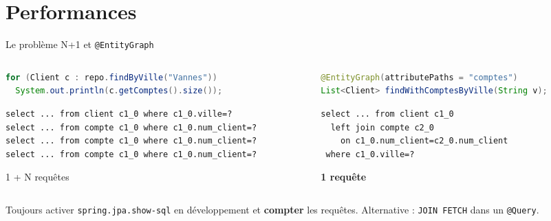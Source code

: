 \documentclass[aspectratio=169,10pt]{beamer}
\begin{document}
\section{Performances}

\begin{frame}[fragile]{Le probl\`eme N+1 et \texttt{@EntityGraph}}
  \begin{columns}[T]
    \begin{column}{0.49\textwidth}
\begin{lstlisting}[language=Java]
for (Client c : repo.findByVille("Vannes"))
  System.out.println(c.getComptes().size());
\end{lstlisting}
\begin{lstlisting}[style=log]
select ... from client c1_0 where c1_0.ville=?
select ... from compte c1_0 where c1_0.num_client=?
select ... from compte c1_0 where c1_0.num_client=?
select ... from compte c1_0 where c1_0.num_client=?
\end{lstlisting}
      \centering\alert{1 + N requ\^etes}
    \end{column}
    \begin{column}{0.49\textwidth}
\begin{lstlisting}[language=Java]
@EntityGraph(attributePaths = "comptes")
List<Client> findWithComptesByVille(String v);
\end{lstlisting}
\begin{lstlisting}[style=log]
select ... from client c1_0
  left join compte c2_0
    on c1_0.num_client=c2_0.num_client
 where c1_0.ville=?
\end{lstlisting}
      \centering\textbf{1 requ\^ete}
    \end{column}
  \end{columns}
  \vspace{2mm}
  {\small Toujours activer \texttt{spring.jpa.show-sql} en d\'eveloppement et \textbf{compter} les requ\^etes. Alternative : \texttt{JOIN FETCH} dans un \texttt{@Query}.}
\end{frame}
\end{document}
